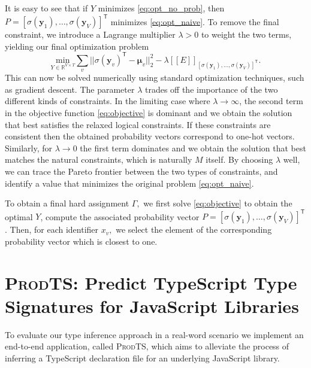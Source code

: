 \documentclass[sigplan,10pt,review,anonymous]{acmart}
\newcommand{\qqpi}[2]{[\![#2]\!]_{#1}}
\newcommand{\prodts}{\textsc{ProdTS}\xspace}
\theoremstyle{plain}
\theoremstyle{remark}
\theoremstyle{definition}
\begin{document}
It is easy to see that if $Y$ minimizes \eqref{eq:opt_no_prob}, 
then $P = [\sigma(\bm{y}_1), \ldots, \sigma(\bm{y}_{V})]^\mathsf{T}$
minimizes \eqref{eq:opt_naive}. To remove the final constraint,
we introduce a Lagrange multiplier $\lambda > 0$ to weight 
the two terms, yielding our final optimization problem
\begin{equation}\label{eq:objective}
 \underset{Y \in \mathbb{R}^{V \times T}}{\mathrm{min}} 
    \sum_v || \sigma(\bm{y}_v)^\mathsf{T} - \bm{\mu}_v ||_2^2 
    - \lambda \qqpi{[\sigma(\bm{y}_1), \ldots, \sigma(\bm{y}_{V})]^\mathsf{T}}{E}.
\end{equation}
This can now be solved numerically using standard optimization
techniques, such as gradient descent.
The parameter $\lambda$ trades off the importance
of the two different kinds of constraints.
In the limiting case where $\lambda \rightarrow \infty$, the second term in the objective function \eqref{eq:objective} is dominant and we obtain the solution that best satisfies the relaxed
logical constraints.
If these constraints are consistent then the obtained probability vectors correspond to one-hot vectors. 
Similarly, for $\lambda \rightarrow 0$ the first term dominates and we obtain the solution that best matches the natural constraints, 
which is naturally $M$ itself. By choosing $\lambda$ well, 
we can trace the Pareto frontier between the two types of constraints,
and identify a value that minimizes the original problem \eqref{eq:opt_naive}.

To obtain a final hard assignment $\Gamma,$ we first solve \eqref{eq:objective} to obtain the optimal $Y$, compute the 
associated probability vector $P = [\sigma(\bm{y}_1), \ldots, \sigma(\bm{y}_{V})]^\mathsf{T}$. Then, for each identifier $x_v,$ 
we select the element of the 
corresponding probability vector which is closest to one.

\section{\prodts: Predict TypeScript Type Signatures for JavaScript Libraries} 
\label{sec:prodts}
To evaluate our type inference approach in a real-word scenario we
implement an end-to-end application, called \prodts, which aims
to alleviate the process of inferring a TypeScript declaration file
for an underlying JavaScript library.
\end{document}
